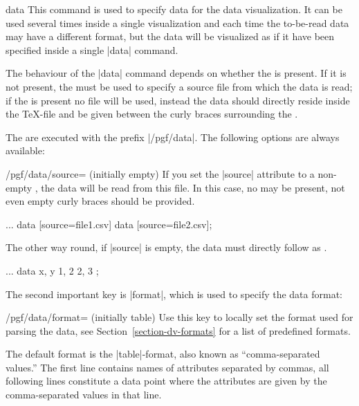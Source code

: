 \begin{datavisualizationoperation}{data}{}
  This command is used to specify data for the data visualization. It
  can be used several times inside a single visualization and each
  time the to-be-read data may have a different format, but the data
  will be visualized as if it have been specified inside a single |data|
  command.

  The behaviour of the |data| command depends on
  whether the  is present. If it is not present, the
   must be used to specify a source file from which the
  data is read; if the  is present no file will be
  used, instead the data should directly reside inside the \TeX-file
  and be given between the curly braces surrounding the .

  The  are executed with the prefix |/pgf/data|. The
  following options are always available:
  \begin{key}{/pgf/data/source= (initially \normalfont empty)}
    If you set the |source| attribute to a non-empty ,
    the data will be read from this file. In this case, no
     may be present, not even empty curly braces
    should be provided. 
\begin{codeexample}
\datavisualization ...
  data [source=file1.csv]
  data [source=file2.csv];
\end{codeexample}
    The other way round, if |source| is empty, the  data must directly
    follow as .
\begin{codeexample}
\datavisualization ...
  data {
    x, y
    1, 2
    2, 3
  };
\end{codeexample}
  \end{key}
  The second important key is |format|, which is used to specify the
  data format:
  \begin{key}{/pgf/data/format= (initially table)}
    Use this key to locally set the format used for parsing the
    data, see Section~\ref{section-dv-formats} for a list of 
    predefined formats.

    The default format is the |table|-format, also known as
    ``comma-separated values.'' The first line contains names of
    attributes separated by commas, all following lines constitute a
    data point where the attributes are given by the comma-separated
    values in that line.
  \end{key}
  

\end{datavisualizationoperation}
